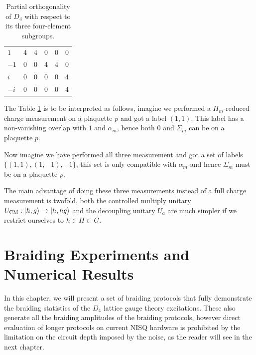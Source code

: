\documentclass[two column]{article}
\newcommand{\caro}[1]{\textcolor{red}{[#1]}}
\begin{document}
\begin{table}[h]
\begin{tabular}{l|lllll}
$1$ & 4   & 4            & 0             & 0               & 0                   \\ 
$-1$ & 0   & 0            & 4             & 4               & 0                   \\ 
$i$ & 0   & 0            & 0             & 0               & 4                   \\ 
$-i$ & 0   & 0            & 0             & 0               & 4                   \\ 
\end{tabular}
\caption{Partial orthogonality of $D_4$ with respect to its three four-element subgroups.}
\label{tab:red_ch}
\end{table}


The Table \ref{tab:red_ch} is to be interpreted as follows, imagine we performed a $H_m$-reduced charge measurement on a plaquette $p$ and got a label $(1,1)$. This label has a non-vanishing overlap with $1$ and $\alpha_m$, hence both $0$ and $\Sigma_m$ can be on a plaquette $p$.

Now imagine we have performed all three measurement and got a set of labels $\{(1, 1), (1, -1), -1\}$, this set is only compatible with $\alpha_m$ and hence $\Sigma_m$ must be on a plaquette $p$.


The main advantage of doing these three measurements instead of a full charge measurement is twofold, both the controlled multiply unitary $U_{\text{CM}}: \ket{h, g} \rightarrow \ket{h, hg}$ and the decoupling unitary $U_a$ are much simpler if we restrict ourselves to $h \in H \subset G$.

\section{Braiding Experiments and Numerical Results}

In this chapter, we will present a set of braiding protocols that fully demonstrate the braiding statistics of the $D_4$ lattice gauge theory excitations. These also generate all the braiding amplitudes of the braiding protocols, however direct evaluation of longer protocols on current NISQ hardware is prohibited by the limitation on the circuit depth imposed by the noise, as the reader will see in the next chapter. 
\end{document}
